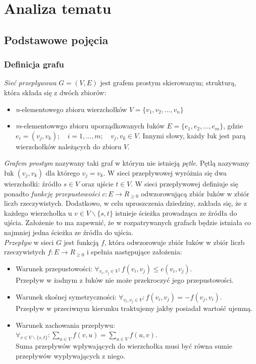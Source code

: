 \chapter{Analiza tematu}
\section{Podstawowe pojęcia}
\subsection{Definicja grafu}\label{ssec:graphDef}
\textit{Sieć przepływowa} $ G=(V, E) $ jest grafem prostym skierowanym; strukturą, która składa się z dwóch zbiorów:
\begin{itemize}
	\item \textit{n}-elementowego zbioru wierzchołków $ V = \{v_1,v_2,...,v_n \}$
	\item \textit{m}-elementowwgo zbioru uporządkowanych łuków $ E = \{e_1,e_2,...,e_m \}$, gdzie $ e_i=(v_j,v_k);\quad i=1,...,m;\quad v_j,v_k\in V$. Innymi słowy, każdy łuk jest parą wierzchołków należących do zbioru $ V $.
\end{itemize}
\textit{Grafem prostym} nazywany taki graf w którym nie istnieją \textit{pętle}. Pętlą nazywamy łuk $ (v_j,v_k) $ dla którego $ v_j=v_k $. W sieci przepływowej wyróżnia się dwa wierzchołki: źródło $ s \in V $ oraz ujście $ t \in V $. W sieci przepływowej definiuje się ponadto \textit{funkcję przepustowości} $ c : E\rightarrow R_{\ge0}$ odwzorowującą zbiór łuków w zbiór liczb rzeczywistych. Dodatkowo, w celu uproszczenia dziedziny, zakłada się, że z każdego wierzchołka u $ v\in V\backslash\{s, t\} $ istnieje ścieżka prowadząca ze źródła do ujścia. Założenie to ma zapewnić, że w rozpatrywanych grafach będzie istniała co najmniej jedna ścieżka ze źródła do ujścia.\\\indent
\textit{Przepływ} w sieci $ G $ jest funkcją $ f $, która odwzorowuje zbiór łuków w zbiór liczb rzeczywistych $ f : E \rightarrow R_{\ge0} $ i spełnia następujące założenia:
\begin{itemize}
	\item Warunek przepustowości: $ \forall_{v_i, v_j\in V} : f(v_i, v_j) \le c(v_i, v_j) $.\\Przepływ w żadnym z łuków nie może przekroczyć jego przepustowości.
	\item Warunek skośnej symetryczności: $ \forall_{v_i, v_j\in V} : f(v_i, v_j) = -f(v_j, v_i) $.\\Przepływ w przeciwnym kierunku traktujemy jakby posiadał wartość ujemną.
	\item Warunek zachowania przepływu: $ \forall_{v\in V\backslash\{s, t\}} : \sum_{u\in V}f(v,u)=\sum_{u\in V}f(u,v) $.\\Suma przepływów wpływających do wierzchołka musi być równa sumie przepływów wypływających z niego.
\end{itemize}
